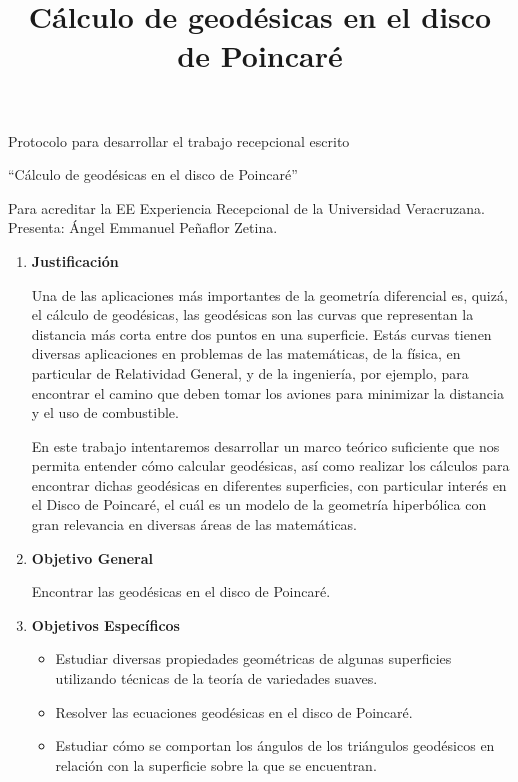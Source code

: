 \documentclass[
  12pt,
  letterpaper,
  spanish
]{article}
\title{Cálculo de geodésicas en el disco de Poincaré}
\date{}
\newcommand{\alumno}{Ángel Emmanuel Peñaflor Zetina}
\newcommand{\tituloTesis}{Cálculo de geodésicas en el disco de Poincaré}
\newcommand{\universidad}{Universidad Veracruzana}
\begin{document}
\pagestyle{empty}				
\normalsize
Protocolo para desarrollar el trabajo recepcional escrito

\Large
\begin{center} \enquote{\tituloTesis} \\ \end{center}

\normalsize
Para acreditar la EE Experiencia Recepcional de la \universidad.\\

Presenta: \alumno.

\begin{enumerate}
\item \textbf{Justificación}

  Una de las aplicaciones más importantes de la geometría diferencial es, quizá, el cálculo de geodésicas, las geodésicas son las curvas que representan la distancia más corta entre dos puntos en una superficie. Estás curvas tienen diversas aplicaciones en problemas de las matemáticas, de la física, en particular de Relatividad General, y de la ingeniería, por ejemplo, para encontrar el camino que deben tomar los aviones para minimizar la distancia y el uso de combustible.

    En este trabajo intentaremos desarrollar un marco teórico suficiente que nos permita entender cómo calcular geodésicas, así como realizar los cálculos para encontrar dichas geodésicas en diferentes superficies, con particular interés en el Disco de Poincaré, el cuál es un modelo de la geometría hiperbólica con gran relevancia en diversas áreas de las matemáticas.

\item \textbf{Objetivo General}

  Encontrar las geodésicas en el disco de Poincaré.
  
\item \textbf{Objetivos Específicos}

    \begin{itemize}
      \item Estudiar diversas propiedades geométricas de algunas superficies utilizando técnicas de la teoría de variedades suaves.
      \item Resolver las ecuaciones geodésicas en el disco de Poincaré.
      \item Estudiar cómo se comportan los ángulos de los triángulos geodésicos en relación con la superficie sobre la que se encuentran.
    \end{itemize}


\end{enumerate}
\end{document}
